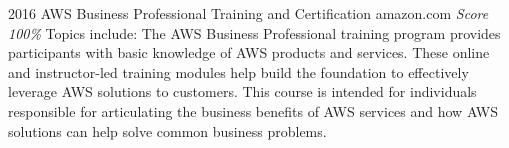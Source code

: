 \documentclass[11pt,a4paper]{moderncv}
\begin{document}
\cventry                                                                                                          %
    {2016}                                                                                                        %
    {AWS Business Professional}                                                                                   %
    {Training and Certification}                                                                                  %
    {amazon.com}                                                                                                  %
    {\textit{Score 100\%}}                                                                                        %
    {                                                                                                             %
        Topics include:                                                                                           %
            The AWS Business Professional training program provides                                               %
                participants with basic knowledge of AWS products                                                 %
                and services.                                                                                     %
            These online and instructor-led training modules help                                                 %
                build the foundation to effectively leverage AWS                                                  %
                solutions to customers.                                                                           %
            This course is intended for individuals responsible for                                               %
                articulating the business benefits of AWS services                                                %
                and how AWS solutions can help solve common business                                              %
                problems.                                                                                         %
    }                                                                                                             %
\end{document}
